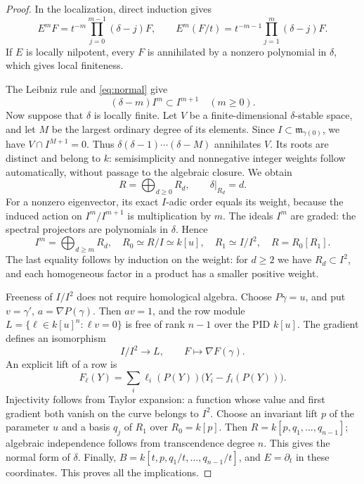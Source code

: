 \begin{proof}
In the localization, direct induction gives
\begin{equation}\label{eq:falling}
E^mF=t^{-m}\prod_{j=0}^{m-1}(\delta-j)F,
\qquad
E^m(F/t)=t^{-m-1}\prod_{j=1}^{m}(\delta-j)F.
\end{equation}
If $E$ is locally nilpotent, every $F$ is annihilated by a nonzero
polynomial in $\delta$, which gives local finiteness.

The Leibniz rule and \eqref{eq:normal} give
\[
(\delta-m)I^m\subset I^{m+1}\quad(m\ge0).
\]
Now suppose that $\delta$ is locally finite.
Let $V$ be a finite-dimensional $\delta$-stable space,
and let $M$ be the largest ordinary degree of its elements.
Since $I\subset\mathfrak m_{\gamma(0)}$, we have $V\cap I^{M+1}=0$.
Thus $\delta(\delta-1)\cdots(\delta-M)$ annihilates $V$.
Its roots are distinct and belong to $k$: semisimplicity and nonnegative
integer weights follow automatically, without passage to the
algebraic closure. We obtain
\[
R=\bigoplus_{d\ge0}R_d,\qquad \delta|_{R_d}=d.
\]
For a nonzero eigenvector, its exact $I$-adic order equals its weight,
because the induced action on $I^m/I^{m+1}$ is multiplication by $m$.
The ideals $I^m$ are graded: the spectral projectors are
polynomials in $\delta$. Hence
\[
I^m=\bigoplus_{d\ge m}R_d,\quad R_0\simeq R/I\simeq k[u],\quad
R_1\simeq I/I^2,\quad R=R_0[R_1].
\]
The last equality follows by induction on the weight: for $d\ge2$ we have
$R_d\subset I^2$, and each homogeneous factor in a product
has a smaller positive weight.

Freeness of $I/I^2$ does not require homological algebra.
Choose $P\gamma=u$, and put $v=\gamma'$, $a=\nabla P(\gamma)$.
Then $av=1$, and the row module
$L=\{\ell\in k[u]^n:\ell v=0\}$ is free of rank $n-1$
over the PID $k[u]$. The gradient defines an isomorphism
\[
I/I^2\longrightarrow L,\qquad F\longmapsto\nabla F(\gamma).
\]
An explicit lift of a row is
\[
F_\ell(Y)=\sum_i\ell_i(P(Y))\bigl(Y_i-f_i(P(Y))\bigr).
\]
Injectivity follows from Taylor expansion: a function whose value
and first gradient both vanish on the curve belongs to $I^2$.
Choose an invariant lift $p$ of the parameter $u$ and a basis $q_j$ of
$R_1$ over $R_0=k[p]$. Then $R=k[p,q_1,\ldots,q_{n-1}]$;
algebraic independence follows from transcendence degree $n$.
This gives the normal form of $\delta$.
Finally, $B=k[t,p,q_1/t,\ldots,q_{n-1}/t]$, and $E=\partial_t$
in these coordinates. This proves all the implications.
\end{proof}

